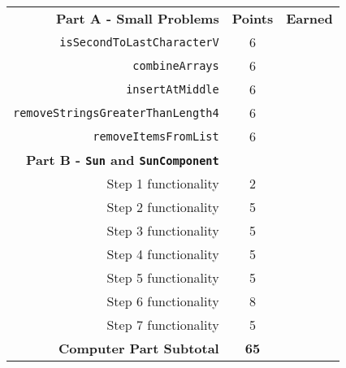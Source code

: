 \documentclass[12pt,twoside]{article}
\newcommand{\fillInBlank}[1][0.5in]{\underline{\hspace{#1}}}
\newcommand{\code}[1]{\texttt{#1}}
\begin{document}
\vspace{.75in}

\begin{flushright}
\begin{tabular}{rcc}
\textbf{Part A - Small Problems} & \textbf{Points} & \textbf{Earned} \\
\code{isSecondToLastCharacterV} & 6 & \fillInBlank\\
\code{combineArrays} & 6 & \fillInBlank\\
\code{insertAtMiddle} & 6 & \fillInBlank\\
\code{removeStringsGreaterThanLength4} & 6 & \fillInBlank\\
\code{removeItemsFromList} & 6 & \fillInBlank\\
\textbf{Part B - \code{Sun} and \code{SunComponent}} &  & \\
Step 1 functionality  & 2 & \fillInBlank \\
Step 2 functionality & 5 & \fillInBlank \\
Step 3 functionality & 5 & \fillInBlank \\
Step 4 functionality & 5 & \fillInBlank \\
Step 5 functionality & 5 & \fillInBlank \\
Step 6 functionality & 8 & \fillInBlank \\
Step 7 functionality & 5 & \fillInBlank \\
\textbf{Computer Part Subtotal} & \textbf{65} & \fillInBlank
\end{tabular}
\end{flushright}
\end{document}
